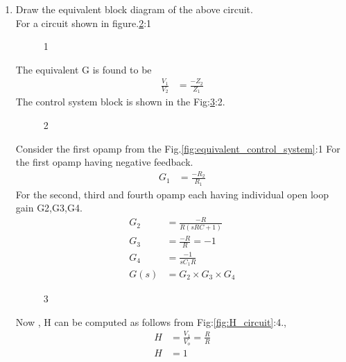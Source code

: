 \begin{enumerate}[label=\arabic*.,ref=\theenumi]
\begin{figure}[!hbt]
\label{fig:Final_circuit}
\end{figure}
\item Draw the equivalent block diagram of the above circuit.\\
\solution 
For a circuit shown in  figure.\ref{fig:example}:1
\begin{figure}[!hbt]
	\begin{center}
			\resizebox{\columnwidth}{!}{}
	\end{center}
\caption{1}
\label{fig:example}
\end{figure}
The equivalent G is found to be 
\begin{align}
    \frac{V_1}{V_2} &= \frac{-Z_2}{Z_1}
\end{align}
The control system block is shown in the Fig:\ref{fig:example_block}:2.
\begin{figure}[!hbt]
	\begin{center}
			\resizebox{\columnwidth}{!}{}
	\end{center}
\caption{2}
\label{fig:example_block}
\end{figure}
Consider the first opamp from the Fig.\ref{fig:equivalent_control_system}:1
For the first opamp having negative feedback.
\begin{align}
    G_1 &= \frac{-R_2}{R_1}
\end{align}
For the second, third and fourth opamp each having individual open loop gain G2,G3,G4.
\begin{align}
    G_2 &= \frac{-R}{R(sRC+1)}\\
    G_3 &= \frac{-R}{R} = -1\\
    G_4 &= \frac{-1}{sC_1R} \\
    G(s) &= G_2\times G_3\times G_4
\end{align}
\begin{figure}[!ht]
	\begin{center}
			\resizebox{\columnwidth}{!}{}
	\end{center}
\caption{3}
\label{fig:equivalent_block}
\end{figure}
Now , H can be computed as follows from Fig:\ref{fig:H_circuit}:4.,
\begin{align}
    H &= \frac{V_1}{V_o} = \frac{R}{R}\\
    H &= 1
\end{align}
\begin{figure}[!ht]

\end{figure}
\end{enumerate}
